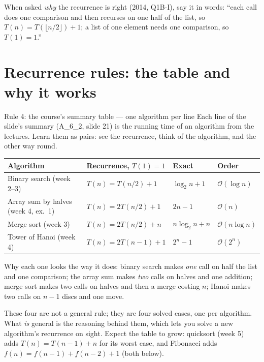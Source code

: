 \documentclass{fkt-notes}
\newcommand{\Oh}{\mathcal{O}}
\begin{document}
When asked \emph{why} the recurrence is right (2014, Q1B-I), say it in words: ``each call does one comparison and then recurses on one half of the list, so $T(n)=T(\lfloor n/2\rfloor)+1$; a list of one element needs one comparison, so $T(1)=1$.''

\section{Recurrence rules: the table and why it works}
\label{sec:recurrences}

\begin{rulebox}{Rule 4: the course's summary table --- one algorithm per line}
Each line of the slide's summary (A\_6\_2, slide 21) is the running time of an algorithm from the lectures. Learn them as pairs: see the recurrence, think of the algorithm, and the other way round.

\smallskip
\centering
\begin{tabular}{@{}llll@{}}
\toprule
Algorithm & Recurrence, $T(1)=1$ & Exact & Order \\
\midrule
Binary search (week 2--3) & $T(n)=T(n/2)+1$ & $\log_2 n+1$ & $\Oh(\log n)$ \\
Array sum by halves (week 4, ex.~1) & $T(n)=2T(n/2)+1$ & $2n-1$ & $\Oh(n)$ \\
Merge sort (week 3) & $T(n)=2T(n/2)+n$ & $n\log_2 n+n$ & $\Oh(n\log n)$ \\
Tower of Hanoi (week 4) & $T(n)=2T(n-1)+1$ & $2^n-1$ & $\Oh(2^n)$ \\
\bottomrule
\end{tabular}

\smallskip
\raggedright
Why each one looks the way it does: binary search makes \emph{one} call on half the list and one comparison; the array sum makes \emph{two} calls on halves and one addition; merge sort makes two calls on halves and then a merge costing $n$; Hanoi makes two calls on $n-1$ discs and one move.
\end{rulebox}

These four are not a general rule; they are four solved cases, one per algorithm. What \emph{is} general is the reasoning behind them, which lets you solve a new algorithm's recurrence on sight. Expect the table to grow: quicksort (week 5) adds $T(n)=T(n-1)+n$ for its worst case, and Fibonacci adds $f(n)=f(n-1)+f(n-2)+1$ (both below).
\end{document}

